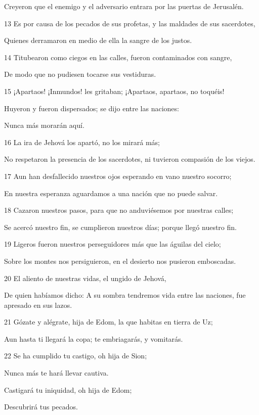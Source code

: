 \par Creyeron que el enemigo y el adversario entrara por las puertas de Jerusalén.
\par 13 Es por causa de los pecados de sus profetas, y las maldades de sus sacerdotes,
\par Quienes derramaron en medio de ella la sangre de los justos.
\par 14 Titubearon como ciegos en las calles, fueron contaminados con sangre,
\par De modo que no pudiesen tocarse sus vestiduras.
\par 15 ¡Apartaos! ¡Inmundos! les gritaban; ¡Apartaos, apartaos, no toquéis!
\par Huyeron y fueron dispersados; se dijo entre las naciones:
\par Nunca más morarán aquí.
\par 16 La ira de Jehová los apartó, no los mirará más;
\par No respetaron la presencia de los sacerdotes, ni tuvieron compasión de los viejos.
\par 17 Aun han desfallecido nuestros ojos esperando en vano nuestro socorro;
\par En nuestra esperanza aguardamos a una nación que no puede salvar.
\par 18 Cazaron nuestros pasos, para que no anduviésemos por nuestras calles;
\par Se acercó nuestro fin, se cumplieron nuestros días; porque llegó nuestro fin.
\par 19 Ligeros fueron nuestros perseguidores más que las águilas del cielo;
\par Sobre los montes nos persiguieron, en el desierto nos pusieron emboscadas.
\par 20 El aliento de nuestras vidas, el ungido de Jehová,
\par De quien habíamos dicho: A su sombra tendremos vida entre las naciones, fue apresado en sus lazos.
\par 21 Gózate y alégrate, hija de Edom, la que habitas en tierra de Uz;
\par Aun hasta ti llegará la copa; te embriagarás, y vomitarás.
\par 22 Se ha cumplido tu castigo, oh hija de Sion;
\par Nunca más te hará llevar cautiva.
\par Castigará tu iniquidad, oh hija de Edom;
\par Descubrirá tus pecados.

